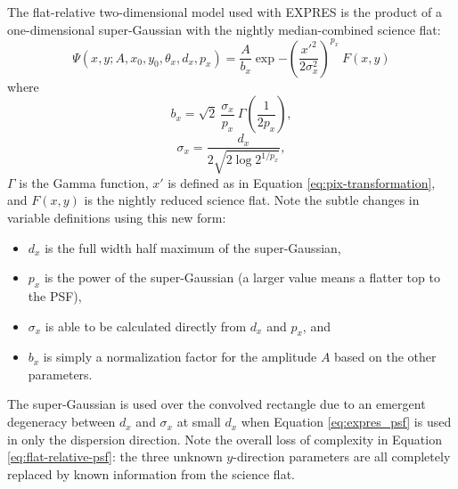 The flat-relative two-dimensional model used with EXPRES is the product of a one-dimensional super-Gaussian with the nightly median-combined science flat:
\begin{equation}
    \Psi(x, y; A, x_0, y_0, \theta_x, d_x, p_x) = \frac{A}{b_x} \exp{-\left(\frac{x'^2}{2\sigma_x^2}\right)^{p_x}}~F(x,y)
    \label{eq:flat-relative-psf}
\end{equation}
where
\begin{equation}
    b_x = \sqrt{2}~\frac{\sigma_x}{p_x}~\Gamma\left(\frac{1}{2 p_x}\right),
\end{equation}
\begin{equation}
    \sigma_x = \frac{d_x}{2\sqrt{2 \log{2}^{1/p_x}}},
\end{equation}
$\Gamma$ is the Gamma function, $x'$ is defined as in Equation \ref{eq:pix-transformation}, and $F(x,y)$ is the nightly reduced science flat. Note the subtle changes in variable definitions using this new form:
\begin{itemize}
    \item $d_x$ is the full width half maximum of the super-Gaussian,
    \item $p_x$ is the power of the super-Gaussian (a larger value means a flatter top to the PSF),
    \item $\sigma_x$ is able to be calculated directly from $d_x$ and $p_x$, and
    \item $b_x$ is simply a normalization factor for the amplitude $A$ based on the other parameters.
\end{itemize}
The super-Gaussian is used over the convolved rectangle due to an emergent degeneracy between $d_x$ and $\sigma_x$ at small $d_x$ when Equation \ref{eq:expres_psf} is used in only the dispersion direction. Note the overall loss of complexity in Equation \ref{eq:flat-relative-psf}: the three unknown $y$-direction parameters are all completely replaced by known information from the science flat.

